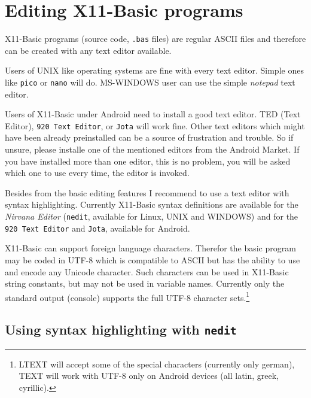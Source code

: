 \section{Editing X11-Basic programs}

X11-Basic programs (source code, \verb|.bas| files) are regular ASCII files and
therefore can be created with any text editor available.  

Users of UNIX like operating systems are fine with every text editor. Simple 
ones like \verb|pico| or \verb|nano| will do. MS-WINDOWS user can use the simple 
{\it notepad} text editor.

Users of X11-Basic under Android need to install a good text editor. TED (Text
Editor), \verb|920 Text Editor|, or \verb|Jota| will work fine. Other text
editors which might have been already preinstalled can be a source of
frustration and trouble. So if unsure, please installe one of the mentioned
editors from the Android Market. If you have installed more than one editor,
this is no problem, you will be asked which one to use every time, the editor
is invoked. 

Besides from the basic editing features I recommend to use a text editor with
syntax highlighting. Currently X11-Basic syntax definitions are available  for
the {\it Nirvana Editor} (\verb|nedit|, available for Linux, UNIX and WINDOWS) 
and for the \verb|920 Text Editor| and \verb|Jota|, available for Android.

X11-Basic can support foreign language characters. Therefor the basic program
may be coded in UTF-8 which is compatible to ASCII but has the  ability to use
and encode any Unicode character. Such characters can be used in X11-Basic
string constants, but may not be used in variable names. Currently  only the
standard output (console) supports the full UTF-8 character
sets.\footnote{LTEXT will accept some of the special characters
(currently only german), TEXT will work with UTF-8 only on Android
devices (all latin, greek, cyrillic). }

\subsection*{Using syntax highlighting with {\tt \bf nedit}}

